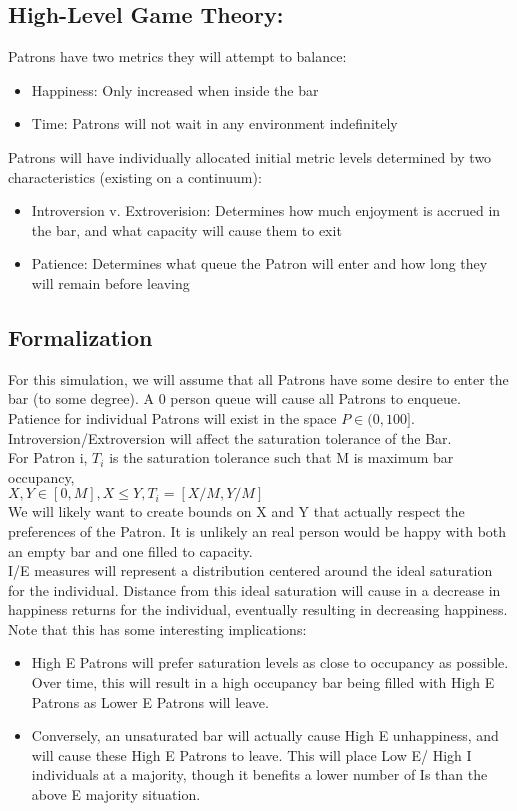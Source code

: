 \documentclass[10pt]{article}
\begin{document}
\subsection{High-Level Game Theory:}
Patrons have two metrics they will attempt to balance:\
\begin{itemize}
\item Happiness: Only increased when inside the bar
\item Time: Patrons will not wait in any environment indefinitely
\end{itemize}
Patrons will have individually allocated initial metric levels determined by two characteristics (existing on a continuum):
\begin{itemize}
\item Introversion v. Extroverision: Determines how much enjoyment is accrued in the bar, and what capacity will cause them to exit
\item Patience: Determines what queue the Patron will enter and how long they will remain before leaving
\end{itemize}
\subsection{Formalization}
For this simulation, we will assume that all Patrons have some desire to enter the bar (to some degree). A 0 person queue will cause all Patrons to enqueue. Patience for individual Patrons will exist in the space $P \in (0,100]$.
Introversion/Extroversion will affect the saturation tolerance of the Bar.\\
For Patron i, $T_i$ is the saturation tolerance such that M is maximum bar occupancy,\\ $X, Y \in [0,M], X \leq Y, T_i = [X/M,Y/M] $\\
We will likely want to create bounds on X and Y that actually respect the preferences of the Patron. It is unlikely an real person would be happy with both an empty bar and one filled to capacity.\\
I/E measures will represent a distribution centered around the ideal saturation for the individual. Distance from this ideal saturation will cause in a decrease in happiness returns for the individual, eventually resulting in decreasing happiness. Note that this has some interesting implications:
\begin{itemize}
\item High E Patrons will prefer saturation levels as close to occupancy as possible. Over time, this will result in a high occupancy bar being filled with High E Patrons as Lower E Patrons will leave.
\item Conversely, an unsaturated bar will actually cause High E unhappiness, and will cause these High E Patrons to leave. This will place Low E/ High I individuals at a majority, though it benefits a lower number of Is than the above E majority situation.
\end{itemize}
\end{document}
